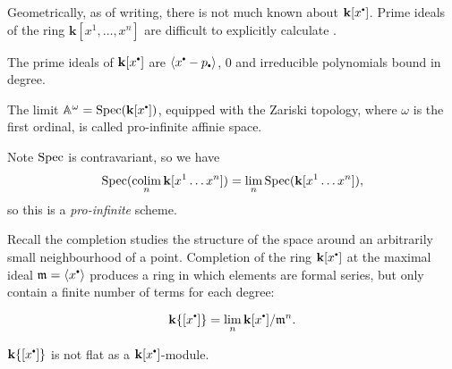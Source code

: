     Geometrically, as of writing, there is not much known about \( \mathbf{k}[x^{\sbt}]\). Prime ideals of the ring \( \mathbf{k}[x^1,\dots,x^n]\) are difficult to explicitly calculate \cite{prime_ideal_n}.
    
    \begin{lem} The prime ideals of \( \mathbf{k}[x^{\sbt}]\) are \( \langle x^{\sbt} - p_{\sbt} \rangle \), \(0\) and irreducible polynomials bound in degree.
    \end{lem}
    
    
    
    
    \begin{defn} 
    The limit \(\mathbb{A}^\omega = \Spec(\mathbf{k}[x^{\sbt}])\), equipped with the Zariski topology, where \(\omega\) is the first ordinal, is called pro-infinite affinie space.
    \end{defn}
    
    Note \( \mathrm{Spec}\) is contravariant, so we have 
    \[ \mathrm{Spec}( \operatorname*{colim}_n \mathbf{k}[x^1\dots x^n]) = \lim_n \mathrm{Spec}( \mathbf{k}[x^1\dots x^n]),\]
    so this is a \emph{pro-infinite} scheme.

    Recall the completion studies the structure of the space around an arbitrarily small neighbourhood of a point. Completion of the ring \( \mathbf{k}[x^{\sbt}]\) at the maximal ideal \( \mathfrak{m} = \langle x^{\sbt} \rangle \) produces a ring in which elements are formal series, but only contain a finite number of terms for each degree:


    \begin{defn}
    \[  \mathbf{k}\{[ x^{\sbt} ]\} = \lim_n \mathbf{k}[x^{\sbt}]/\mathfrak{m}^n.  \]
    \end{defn}


    \begin{lem} 
    \( \mathbf{k}\{[ x^{\sbt} ]\}\) is not flat as a \( \mathbf{k}[x^{\sbt}]\)-module.
    \end{lem} 
    

